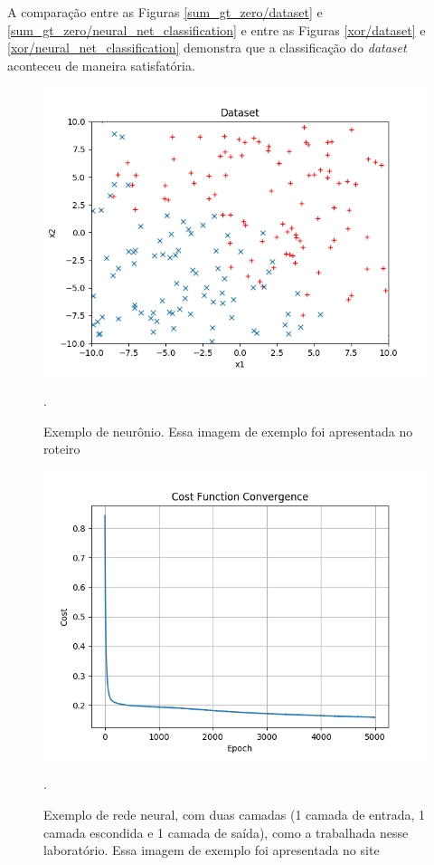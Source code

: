 \documentclass[conference]{IEEEtran}
\begin{document}
A comparação entre as Figuras \ref{sum_gt_zero/dataset} e \ref{sum_gt_zero/neural_net_classification} e entre as Figuras \ref{xor/dataset} e \ref{xor/neural_net_classification} demonstra que a classificação do \textit{dataset} aconteceu de maneira satisfatória.

\begin{figure}[htbp]
\centering
\centerline{\includegraphics[scale=0.5]{imagens/sum_gt_zero/lambda_zero/dataset_sgz.png}}
\caption{Exemplo de neurônio. Essa imagem de exemplo foi apresentada no roteiro \cite{roteiro}}.
\label{sum_gt_zero/lambda_zero/dataset_sgz}
\end{figure}

\begin{figure}[htbp]
\centering
\centerline{\includegraphics[scale=0.5]{imagens/sum_gt_zero/lambda_zero/convergence_sgz.png}}
\caption{Exemplo de rede neural, com duas camadas (1 camada de entrada, 1 camada escondida e 1 camada de saída), como a trabalhada nesse laboratório. Essa imagem de exemplo foi apresentada no site \cite{neural-net-np}}.
\label{sum_gt_zero/lambda_zero/convergence_sgz}
\end{figure}
\end{document}

